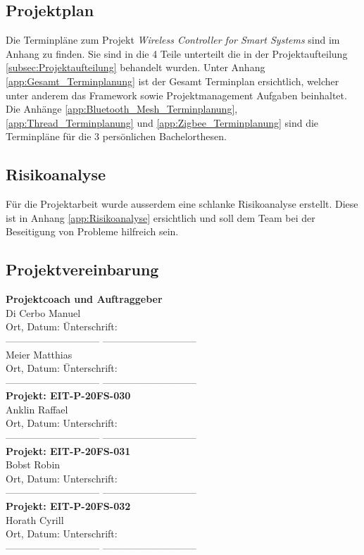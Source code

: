 \subsection{Projektplan}\label{subsec:Projektplan}
Die Terminpläne zum Projekt \textit{Wireless Controller for Smart Systems} sind im Anhang zu finden. Sie sind in die 4 Teile unterteilt die in der Projektaufteilung \ref{subsec:Projektaufteilung} behandelt wurden. Unter Anhang \ref{app:Gesamt_Terminplanung} ist der Gesamt Terminplan ersichtlich, welcher unter anderem das Framework sowie Projektmanagement Aufgaben beinhaltet. Die Anhänge \ref{app:Bluetooth_Mesh_Terminplanung}, \ref{app:Thread_Terminplanung} und \ref{app:Zigbee_Terminplanung} sind die Terminpläne für die 3 persönlichen Bachelorthesen.


\subsection{Risikoanalyse}\label{subsec:Risikoanalyse}
Für die Projektarbeit wurde ausserdem eine schlanke Risikoanalyse erstellt. Diese ist in Anhang \ref{app:Risikoanalyse} ersichtlich und soll dem Team bei der Beseitigung von Probleme hilfreich sein.

\newpage
\subsection{Projektvereinbarung}\label{subsec:Projektvereinbarung}

	\begin{tabbing}
		\textbf{Projektcoach und Auftraggeber}\\[0.2cm]
		Di Cerbo Manuel\\[0.2cm]
		Ort, Datum: \hspace{5cm}\=Unterschrift:
		\\[0.5cm]----------------------------- \>-----------------------------
		\\[0.2cm]
		Meier Matthias\\[0.2cm]
		Ort, Datum: \hspace{5cm}\=Unterschrift:
		\\[0.5cm]----------------------------- \>-----------------------------
		\\[1cm]
		\textbf{Projekt: EIT-P-20FS-030}\\[0.2cm]
		Anklin Raffael\\[0.2cm]
		Ort, Datum: \>Unterschrift:
		\\[0.5cm]----------------------------- \>-----------------------------
		\\[0.2cm]
		\textbf{Projekt: EIT-P-20FS-031}\\[0.2cm]		
		Bobst Robin\\[0.2cm]
		Ort, Datum: \>Unterschrift:
		\\[0.5cm]----------------------------- \>-----------------------------
		\\[0.2cm]
		\textbf{Projekt: EIT-P-20FS-032}\\[0.2cm]
		Horath Cyrill\\[0.2cm]
		Ort, Datum: \>Unterschrift:
		\\[0.5cm]----------------------------- \>-----------------------------
	\end{tabbing}
	
	\clearpage